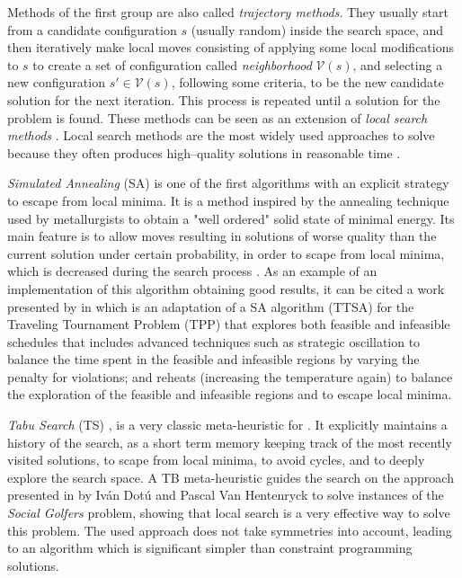 Methods of the first group are also called {\it trajectory methods}. They usually start from a candidate configuration $s$ (usually random) inside the search space, and then iteratively make local moves consisting of applying some local modifications to $s$ to create a set of configuration called \textit{neighborhood} $\mathcal{V}\left(s\right)$, and selecting a new configuration $s'\in \mathcal{V}\left(s\right)$, following some criteria, to be the new candidate solution for the next iteration. This process is repeated until a solution for the problem is found. These methods can be seen as an extension of \textit{local search methods} \cite{Boussaid2013}. Local search methods are the most widely used approaches to solve \COPs{} because they often produces high--quality solutions in reasonable time \cite{Voss2012}.
 
{\it Simulated Annealing} (SA) \cite{Nikolaev2010} is one of the first algorithms with an explicit strategy to escape from local minima. It is a method inspired by the annealing technique used by metallurgists to obtain a "well ordered" solid state of minimal energy. Its main feature is to allow moves resulting in solutions of worse quality than the current solution under certain probability, in order to scape from local minima, which is decreased during the search process \cite{Blum2003}. As an example of an implementation of this algorithm obtaining good results, it can be cited a work presented by  in \cite{Anagnostopoulos2006} which is an adaptation of a SA algorithm (TTSA) for the Traveling Tournament Problem (TPP) that explores both feasible and infeasible schedules that includes advanced techniques such as strategic oscillation to balance the time spent in the feasible and infeasible regions by varying the penalty for violations; and reheats (increasing the temperature again) to balance the exploration of the feasible and infeasible regions and to escape local minima.

{\it Tabu Search} (TS) \cite{Gendreau2010}, is a very classic meta-heuristic for \COPs. It explicitly maintains a history of the search, as a short term memory keeping track of the most recently visited solutions, to scape from local minima, to avoid cycles, and to deeply explore the search space. A TB meta-heuristic guides the search on the approach presented in \cite{IvanDotu2007} by Iván Dotú and Pascal Van Hentenryck to solve instances of the \textit{Social Golfers} problem, showing that local search is a very effective way to solve this problem. The used approach does not take symmetries into account, leading to an algorithm which is significant simpler than constraint programming solutions. 

